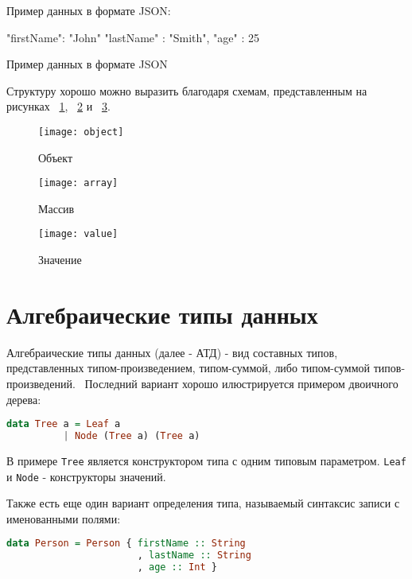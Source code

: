 \begin{ListingEnv}[H]
Пример данных в формате JSON:
\begin{Verb}
{     
    "firstName": "John"
    "lastName" : "Smith",
    "age" : 25
}
\end{Verb}
\caption{Пример данных в формате JSON}
\label{listing:jsonExample}
\end{ListingEnv}

Структуру хорошо можно выразить благодаря схемам, представленным на рисунках ~\ref{fig:objectGr}, ~\ref{fig:arrayGr} и ~\ref{fig:valueGr}.

\begin{figure}[!ht]
\centering
\texttt{[image: object]}
\caption{\label{fig:objectGr}Объект}
\end{figure}

\begin{figure}[!ht]
\centering
\texttt{[image: array]}
\caption{\label{fig:arrayGr}Массив}
\end{figure}

\begin{figure}[!ht]
\centering
\texttt{[image: value]}
\caption{\label{fig:valueGr}Значение}
\end{figure}

\section{Алгебраические типы данных}

Алгебраические типы данных (далее - АТД) - вид составных типов, представленных типом-произведением, типом-суммой, либо типом-суммой типов-произведений.~\cite{haskellGreatGood} Последний вариант хорошо илюстрируется примером двоичного дерева:

\begin{lstlisting}[language=Haskell]
data Tree a = Leaf a
          | Node (Tree a) (Tree a)
\end{lstlisting}

В примере \lstinline{Tree} является конструктором типа с одним типовым параметром. \lstinline{Leaf} и \lstinline{Node} - конструкторы значений. 

Также есть еще один вариант определения типа, называемый синтаксис записи с именованными полями:

\begin{lstlisting}[language=Haskell]
data Person = Person { firstName :: String
                       , lastName :: String
                       , age :: Int }
\end{lstlisting}

